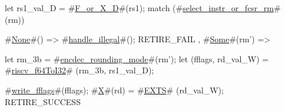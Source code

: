 let rs1_val_D = #\hyperref[sailRISCVzFzyorzyXzyD]{F\_or\_X\_D}#(rs1);
match (#\hyperref[sailRISCVzselectzyinstrzyorzyfcsrzyrm]{select\_instr\_or\_fcsr\_rm}# (rm)) {
  #\hyperref[sailRISCVzNone]{None}#() => { #\hyperref[sailRISCVzhandlezyillegal]{handle\_illegal}#(); RETIRE_FAIL },
  #\hyperref[sailRISCVzSome]{Some}#(rm') => {
    let rm_3b = #\hyperref[sailRISCVzencdeczyroundingzymode]{encdec\_rounding\_mode}#(rm');
    let (fflags, rd_val_W) = #\hyperref[sailRISCVzriscvzyf64ToI32]{riscv\_f64ToI32}# (rm_3b, rs1_val_D);

    #\hyperref[sailRISCVzwritezyfflags]{write\_fflags}#(fflags);
    #\hyperref[sailRISCVzX]{X}#(rd) = #\hyperref[sailRISCVzEXTS]{EXTS}# (rd_val_W);
    RETIRE_SUCCESS
  }
}
